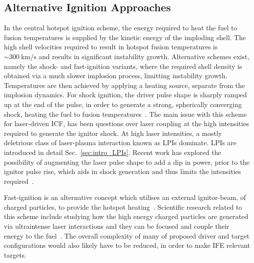 \subsection{Alternative Ignition Approaches}%
\label{sec:intro_icf_alt}

In the central hotspot ignition scheme, the energy required to heat the fuel to fusion temperatures is supplied by the kinetic energy of the imploding shell.
The high shell velocities required to result in hotspot fusion temperatures is $\sim300\ \text{km/s}$ and results in significant instability growth.
Alternative schemes exist, namely the shock- and fast-ignition variants, where the required shell density is obtained via a much slower implosion process, limitting instability growth.
Temperatures are then achieved by applying a heating source, separate from the implosion dynamics.
For shock ignition, the driver pulse shape is sharply ramped up at the end of the pulse, in order to generate a strong, spherically converging shock, heating the fuel to fusion temperatures~\cite{betti_shock_2007,perkins_shock_2009}.
The main issue with this scheme for laser-driven \ac{ICF}, has been questions over laser coupling at the high intensities required to generate the ignitor shock.
At high laser intensities, a mostly deletrious class of laser-plasma interaction known as \ac{LPIs} dominate.
\ac{LPIs} are introduced in detail Sec.~\ref{sec:intro_LPIs}.
Recent work has explored the possibility of augmenting the laser pulse shape to add a dip in power, prior to the ignitor pulse rise, which aids in shock generation and thus limits the intensities required~\cite{scott_shock-augmented_2022}.

Fast-ignition is an alternative concept which utilises an external ignitor-beam, of charged particles, to provide the hotspot heating~\cite{tabak_ignition_1994}.
Scientific research related to this scheme include studying how the high energy charged particles are generated via ultraintense laser interactions and they can be focused and couple their energy to the fuel~\cite{jarrott_visualizing_2016,gong_direct_2019}.
The overall complexity of many of proposed driver and target configurations would also likely have to be reduced, in order to make \ac{IFE} relevant targets.

